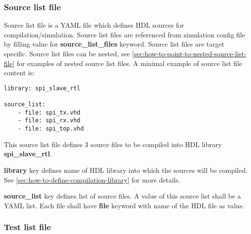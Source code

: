 \documentclass{tropic_design_spec}
\begin{document}


\subsubsection{Source list file}
\label{sec:source-list-file}

Source list file is a YAML file which defines HDL sources for compilation/simulation.
Source list files are referenced from simulation config file by filling value for
\textbf{source_list_files} keyword. Source list files are target specific. Source list
files can be nested, see \ref{sec:how-to-point-to-nested-source-list-file} for examples
of nested source list files. A minimal example of source list file content is:

\begin{lstlisting}
library: spi_slave_rtl

source_list:
    - file: spi_tx.vhd
    - file: spi_rx.vhd
    - file: spi_top.vhd
\end{lstlisting}

This source list file defines 3 source files to be compiled into HDL library
\textbf{spi_slave_rtl}.

\textbf{library} key defines name of HDL library into which the sources will be compiled.
                 See \ref{sec:how-to-define-compilation-library} for more details.

\textbf{source_list} key defines list of source files. A value of this source list
    shall be a YAML list. Each file shall have \textbf{file} keyword with name of
    the HDL file as value.



\subsubsection{Test list file}
\label{sec:test-list-file}
\end{document}
